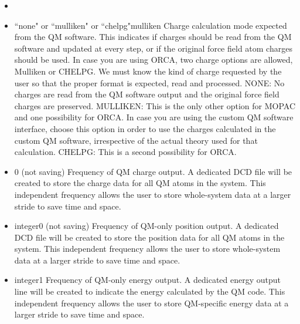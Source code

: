 \begin{itemize}
\item
{}

\item
{}%
{``none" or ``mulliken" or ``chelpg"}{mulliken}{%
Charge calculation mode expected from the QM software. This
indicates if charges should be read from the QM software and
updated at every step, or if the original force field atom
charges should be used. In case you are using ORCA, two charge
options are allowed, Mulliken or CHELPG. We must know the kind
of charge requested by the user so that the proper format is expected,
read and processed. NONE: No charges are read from the QM software
output and the original force field charges are preserved.
MULLIKEN: This is the only other option for MOPAC and one possibility
for ORCA. In case you are using the custom QM software interface,
choose this option in order to use the charges calculated in the
custom QM software, irrespective of the actual theory used for
that calculation. CHELPG: This is a second possibility for ORCA.
}

\item
{}%
{0 (not saving)}{%
Frequency of QM charge output. A dedicated DCD file will be created
to store the charge data for all QM atoms in the system. This
independent frequency allows the user to store whole-system data
at a larger stride to save time and space.
}

\item
{}%
{integer}{0 (not saving)}{%
Frequency of QM-only position output. A dedicated DCD file will be
created to store the position data for all QM atoms in the system.
This independent frequency allows the user to store whole-system
data at a larger stride to save time and space.
}

\item
{}%
{integer}{1}{%
Frequency of QM-only energy output. A dedicated energy output line will be 
created to indicate the energy calculated by the QM code.
This independent frequency allows the user to store QM-specific energy 
data at a larger stride to save time and space.
}


\end{itemize}
